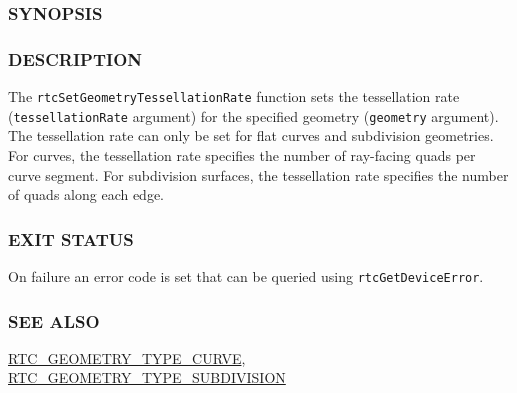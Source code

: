 \begin{Shaded}
\begin{Highlighting}[]
\OperatorTok{{-}}
\end{Highlighting}
\end{Shaded}

\subsubsection{SYNOPSIS}\label{synopsis}

\begin{Shaded}
\begin{Highlighting}[]

\OperatorTok{(}
\OperatorTok{,}
\OperatorTok{);}
\end{Highlighting}
\end{Shaded}

\subsubsection{DESCRIPTION}\label{description}

The \texttt{rtcSetGeometryTessellationRate} function sets the
tessellation rate (\texttt{tessellationRate} argument) for the specified
geometry (\texttt{geometry} argument). The tessellation rate can only be
set for flat curves and subdivision geometries. For curves, the
tessellation rate specifies the number of ray-facing quads per curve
segment. For subdivision surfaces, the tessellation rate specifies the
number of quads along each edge.

\subsubsection{EXIT STATUS}\label{exit-status}

On failure an error code is set that can be queried using
\texttt{rtcGetDeviceError}.

\subsubsection{SEE ALSO}\label{see-also}

\hyperref[rtc_geometry_type_curve]{RTC\_GEOMETRY\_TYPE\_CURVE},
\hyperref[rtc_geometry_type_subdivision]{RTC\_GEOMETRY\_TYPE\_SUBDIVISION}

